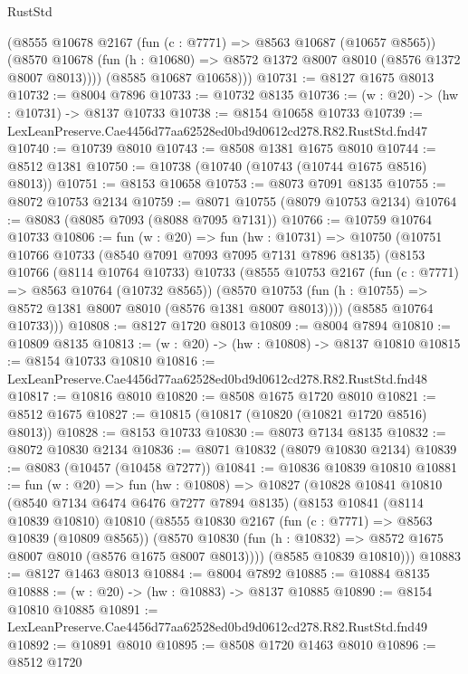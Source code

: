 \begin{lexlean}{RustStd}
\begin{coremodule}
        (@8555
          @10678
          @2167
          (fun (c : @7771) => @8563 @10687 (@10657 @8565))
          (@8570 @10678 (fun (h : @10680) => @8572 @1372 @8007 @8010 (@8576 @1372 @8007 @8013))))
        (@8585 @10687 @10658)))
@10731 := @8127 @1675 @8013
@10732 := @8004 @7896
@10733 := @10732 @8135
@10736 := (w : @20) -> (hw : @10731) -> @8137 @10733
@10738 := @8154 @10658 @10733
@10739 := LexLeanPreserve.Cae4456d77aa62528ed0bd9d0612cd278.R82.RustStd.fnd47
@10740 := @10739 @8010
@10743 := @8508 @1381 @1675 @8010
@10744 := @8512 @1381
@10750 := @10738 (@10740 (@10743 (@10744 @1675 @8516) @8013))
@10751 := @8153 @10658
@10753 := @8073 @7091 @8135
@10755 := @8072 @10753 @2134
@10759 := @8071 @10755 (@8079 @10753 @2134)
@10764 := @8083 (@8085 @7093 (@8088 @7095 @7131))
@10766 := @10759 @10764 @10733
@10806 := fun (w : @20) =>
  fun (hw : @10731) =>
  @10750
    (@10751
      @10766
      @10733
      (@8540 @7091 @7093 @7095 @7131 @7896 @8135)
      (@8153
        @10766
        (@8114 @10764 @10733)
        @10733
        (@8555
          @10753
          @2167
          (fun (c : @7771) => @8563 @10764 (@10732 @8565))
          (@8570 @10753 (fun (h : @10755) => @8572 @1381 @8007 @8010 (@8576 @1381 @8007 @8013))))
        (@8585 @10764 @10733)))
@10808 := @8127 @1720 @8013
@10809 := @8004 @7894
@10810 := @10809 @8135
@10813 := (w : @20) -> (hw : @10808) -> @8137 @10810
@10815 := @8154 @10733 @10810
@10816 := LexLeanPreserve.Cae4456d77aa62528ed0bd9d0612cd278.R82.RustStd.fnd48
@10817 := @10816 @8010
@10820 := @8508 @1675 @1720 @8010
@10821 := @8512 @1675
@10827 := @10815 (@10817 (@10820 (@10821 @1720 @8516) @8013))
@10828 := @8153 @10733
@10830 := @8073 @7134 @8135
@10832 := @8072 @10830 @2134
@10836 := @8071 @10832 (@8079 @10830 @2134)
@10839 := @8083 (@10457 (@10458 @7277))
@10841 := @10836 @10839 @10810
@10881 := fun (w : @20) =>
  fun (hw : @10808) =>
  @10827
    (@10828
      @10841
      @10810
      (@8540 @7134 @6474 @6476 @7277 @7894 @8135)
      (@8153
        @10841
        (@8114 @10839 @10810)
        @10810
        (@8555
          @10830
          @2167
          (fun (c : @7771) => @8563 @10839 (@10809 @8565))
          (@8570 @10830 (fun (h : @10832) => @8572 @1675 @8007 @8010 (@8576 @1675 @8007 @8013))))
        (@8585 @10839 @10810)))
@10883 := @8127 @1463 @8013
@10884 := @8004 @7892
@10885 := @10884 @8135
@10888 := (w : @20) -> (hw : @10883) -> @8137 @10885
@10890 := @8154 @10810 @10885
@10891 := LexLeanPreserve.Cae4456d77aa62528ed0bd9d0612cd278.R82.RustStd.fnd49
@10892 := @10891 @8010
@10895 := @8508 @1720 @1463 @8010
@10896 := @8512 @1720

\end{coremodule}
\end{lexlean}
